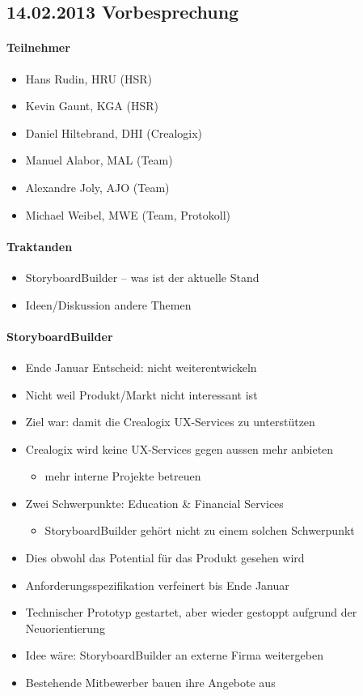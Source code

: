 \subsection*{14.02.2013 Vorbesprechung}

\paragraph*{Teilnehmer}

\begin{itemize}
	\item Hans Rudin, HRU (HSR)
	\item Kevin Gaunt, KGA (HSR)
	\item Daniel Hiltebrand, DHI (Crealogix)
	\item Manuel Alabor, MAL (Team)
	\item Alexandre Joly, AJO (Team)
	\item Michael Weibel, MWE (Team, Protokoll)
\end{itemize}

\paragraph*{Traktanden}
\begin{itemize}
	\item StoryboardBuilder -- was ist der aktuelle Stand
	\item Ideen/Diskussion andere Themen
\end{itemize}

\paragraph*{StoryboardBuilder}
\begin{itemize}
	\item Ende Januar Entscheid: nicht weiterentwickeln
	\item Nicht weil Produkt/Markt nicht interessant ist
	\item Ziel war: damit die Crealogix UX-Services zu unterstützen
	\item Crealogix wird keine UX-Services gegen aussen mehr anbieten
		\begin{itemize}
			\item mehr interne Projekte betreuen
		\end{itemize}
	\item Zwei Schwerpunkte: Education \& Financial Services
		\begin{itemize}
			\item StoryboardBuilder gehört nicht zu einem solchen Schwerpunkt
		\end{itemize}
	\item Dies obwohl das Potential für das Produkt gesehen wird
	\item Anforderungsspezifikation verfeinert bis Ende Januar
	\item Technischer Prototyp gestartet, aber wieder gestoppt aufgrund der Neuorientierung
	\item Idee wäre: StoryboardBuilder an externe Firma weitergeben
	\item Bestehende Mitbewerber bauen ihre Angebote aus
\end{itemize}

